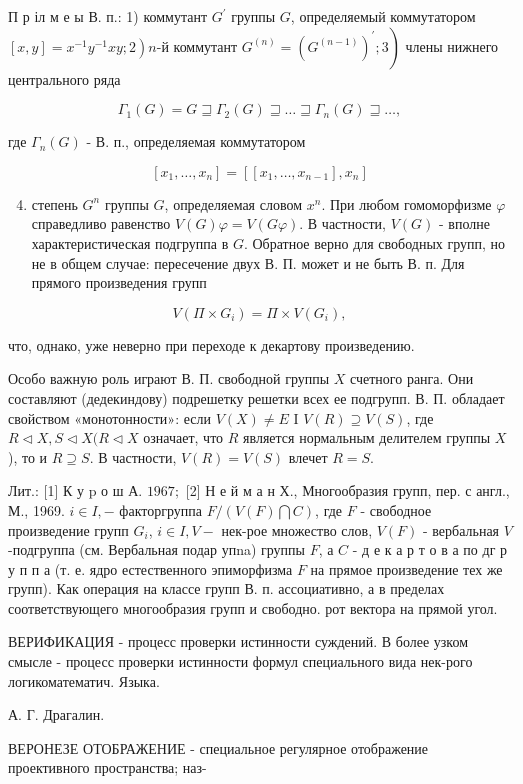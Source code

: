 \documentclass[10pt]{article}
\begin{document}
П р іл м е ы В. п.: 1) коммутант $G^{\prime}$ группы $G$, определяемый коммутатором $\left.[x, y]=x^{-1} y^{-1} x y ; 2\right) n$-й коммутант $\left.G^{(n)}=\left(G^{(n-1)}\right)^{\prime} ; 3\right)$ члены нижнего центрального ряда



\[

\Gamma_{1}(G)=G \sqsupseteq \Gamma_{2}(G) \sqsupseteq \ldots \sqsupseteq \Gamma_{n}(G) \sqsupseteq \ldots,

\]



где $\Gamma_{n}(G)$ - В. п., определяемая коммутатором



\[

\left[x_{1}, \ldots, x_{n}\right]=\left[\left[x_{1}, \ldots, x_{n-1}\right], x_{n}\right]

\]



\begin{enumerate}

  \setcounter{enumi}{3}

  \item степень $G^{n}$ группы $G$, определяемая словом $x^{n}$. При любом гомоморфизме $\varphi$ справедливо равенство $V(G) \varphi=V(G \varphi)$. В частности, $V(G)$ - вполне характеристическая подгруппа в $G$. Обратное верно для свободных групп, но не в общем случае: пересечение двух В. П. может и не быть В. п. Для прямого произведения групп

\end{enumerate}



\[

V\left(\Pi \times G_{i}\right)=\Pi \times V\left(G_{i}\right),

\]



что, однако, уже неверно при переходе к декартову произведению.



Особо важную роль играют В. П. свободной группы $X$ счетного ранга. Они составляют (дедекиндову) подрешетку решетки всех ее подгрупп. В. П. обладает свойством «монотонности»: если $V(X) \neq E$ I $V(R) \supseteq V(S)$, где $R \triangleleft X, S \triangleleft X(R \triangleleft X$ означает, что $R$ является нормальным делителем группы $X$ ), то и $R \supseteq S$. В частности, $V(R)=V(S)$ влечет $R=S$.



Лит.: [1] К у p о ш А. $1967 ;$ [2] Н е й м а н Х., Многообразия групп, пер. с англ., М., 1969. $i \in I,-$ факторгруппа $F /(V(F) \bigcap C)$, где $F$ - свободное произведение групп $G_{i}$, $i \in I, V-$ нек-рое множество слов, $V(F)$ - вербальная $V$-подгруппа (см. Вербальная подар упna) группы $F$, а $C$ - д е к а р т о в а по дг р у п п а (т. е. ядро естественного эпиморфизма $F$ на прямое произведение тех же групп). Как операция на классе групп В. п. ассоциативно, а в пределах соответствующего многообразия групп и свободно. рот вектора на прямой угол.



ВЕРИФИКАЦИЯ - процесс проверки истинности суждений. В более узком смысле - процесс проверки истинности формул специального вида нек-рого логикоматематич. Языка.



А. Г. Драгалин.



ВЕРОНЕЗЕ ОТОБРАЖЕНИЕ - специальное регулярное отображение проективного пространства; наз-
\end{document}
